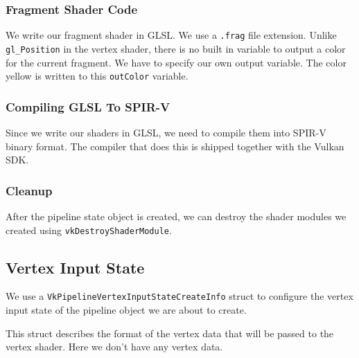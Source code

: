 \subsubsection{Fragment Shader Code}

We write our fragment shader in GLSL.
We use a \texttt{.frag} file extension.
Unlike \texttt{gl\_Position} in the vertex shader, there is no built in
variable to output a color for the current fragment.
We have to specify our own output variable.
The color yellow is written to this \texttt{outColor} variable.

\begin{minipage}{\linewidth}{\noindent}
    
\end{minipage}

\subsubsection{Compiling GLSL To SPIR-V}

Since we write our shaders in GLSL, we
need to compile them into SPIR-V binary format.
The compiler that does this is shipped together with the Vulkan SDK.

\subsubsection{Cleanup}

After the pipeline state object is created, we can destroy the shader modules
we created using \texttt{vkDestroyShaderModule}.

\subsection{Vertex Input State}

We use a \texttt{VkPipelineVertexInputStateCreateInfo} struct to configure the
vertex input state of the pipeline object we are about to create.

This struct describes the format of the vertex data that will be passed
to the vertex shader.
Here we don't have any vertex data.

\begin{minipage}{\linewidth}{\noindent}
    
\end{minipage}


